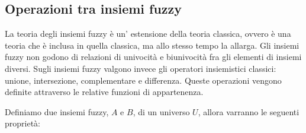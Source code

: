 \documentclass[a4paper,12pt]{report}
\begin{document}

\subsection*{Operazioni tra insiemi fuzzy}
La teoria degli insiemi fuzzy è un' estensione della teoria classica, ovvero è una teoria che è inclusa in quella classica, ma allo stesso tempo la allarga. 
Gli insiemi fuzzy non godono di relazioni di univocità e biunivocità fra gli elementi di insiemi diversi.
Sugli insiemi fuzzy valgono invece gli operatori insiemistici classici: unione, intersezione, complementare e differenza.
Queste operazioni vengono definite attraverso le relative funzioni di appartenenza.

\bigskip

Definiamo due insiemi fuzzy, $A$ e $B$, di un universo $U$, allora varranno le seguenti proprietà:
\end{document}
